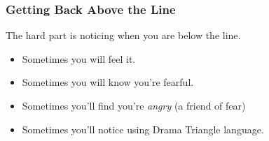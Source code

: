 \documentclass[12pt]{beamer}
\begin{document}
\begin{frame}
    \frametitle{Getting Back Above the Line}
The hard part is \alert{noticing when you are below the line}. 
\begin{itemize}
    \item Sometimes you will feel it.
    \item Sometimes you will know you're fearful.
    \item Sometimes you'll find you're \emph{angry} (a friend of fear)
    \item Sometimes you'll notice using Drama Triangle language.
\end{itemize}
\end{frame}
\end{document}

